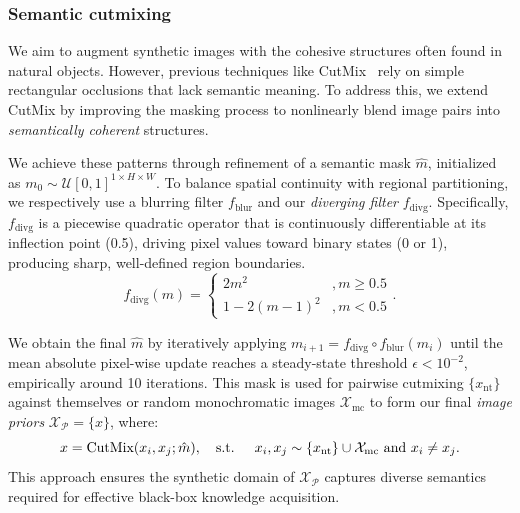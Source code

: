 \subsubsection{Semantic cutmixing} \label{sec:03-framework-synthesis-semcutmix}
\begin{foldable} %
  We aim to augment synthetic images with the cohesive structures often found in natural objects.
  However, previous techniques like CutMix~\cite{yun2019cutmix} rely on simple rectangular occlusions that lack semantic meaning.
  To address this, we extend CutMix by improving the masking process to nonlinearly blend image pairs into \textit{semantically coherent} structures.
\end{foldable}

\begin{foldable} %
  We achieve these patterns through refinement of a semantic mask $\hat{m}$, initialized as $m_{0} \sim \mathcal{U}[0,1]^{1 \times H \times W}$.
  To balance spatial continuity with regional partitioning, we respectively use a blurring filter $f_\text{blur}$ and our \textit{diverging filter} $f_\text{divg}$.
  Specifically, $f_\text{divg}$ is a piecewise quadratic operator that is continuously differentiable at its inflection point (0.5), driving pixel values toward binary states (0 or 1), producing sharp, well-defined region boundaries.
  \begin{equation} \label{eq:synthesis-diverging-filter}
    f_\text{divg}(m) =
    \begin{cases}
      2 m^2           & , m \ge 0.5 \\
      1 - 2 (m - 1)^2 & , m < 0.5
    \end{cases}.
  \end{equation}
\end{foldable}

\begin{foldable} %
  We obtain the final $\hat{m}$ by iteratively applying $m_{i+1} = f_\text{divg} \circ f_\text{blur}(m_i)$ until the mean absolute pixel-wise update reaches a steady-state threshold $\epsilon < 10^{-2}$, empirically around 10 iterations.
  This mask is used for pairwise cutmixing $\{x_\text{nt}\}$ against themselves or random monochromatic images $\mathcal{X}_\text{mc}$ to form our final \textit{image priors} $\mathcal{X}_\mathcal{P} = \{x\}$, where:
  \begin{equation} \label{eq:synthesis-semcutmix}
    x= \text{CutMix}(x_i, x_j; \hat{m}), \text{\quad s.t. \quad} x_i,x_j \sim \{x_\text{nt}\} \cup \mathcal{X}_\text{mc} \text{ and } x_i \ne x_j.
  \end{equation}
  This approach ensures the synthetic domain of $\mathcal{X}_\mathcal{P}$ captures diverse semantics required for effective black-box knowledge acquisition.
\end{foldable}

